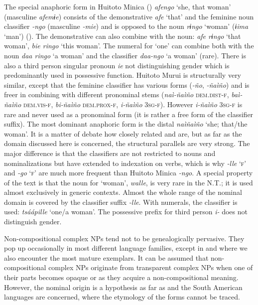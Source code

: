 \documentclass[output=collectionpaper]{langsci/langscibook}
\begin{document}
The special anaphoric form in Huitoto Minica () \textit{afengo} ‘she, that woman’ (masculine \textit{afemɨe}) consists of the demonstrative \textit{afe} ‘that’ and the feminine noun classifier \textit{-ngo} (masculine \textit{-mie}) and is opposed to the noun \textit{rɨngo} ‘woman’ (\textit{ɨima} ‘man’) (\citealt{Minor1982}). The demonstrative can also combine with the noun: \textit{afe rɨngo} ‘that woman’, \textit{bie ringo} ‘this woman’. The numeral for ‘one’ can combine both with the noun \textit{daa ringo} ‘a woman’ and the classifier \textit{daa-ngo} ‘a woman’ (rare). There is also a third person singular pronoun \textit{ie} not distinguishing gender which is predominantly used in possessive function. Huitoto Murui is structurally very similar, except that the feminine classifier has various forms (\textit{-ño}, \textit{-ñaìño})
and is freer in combining with different pronominal stems (\textit{naì-ñaìño} \textsc{dem.dist-f}, \textit{baì-ñaìño} \textsc{dem.vis-f}, \textit{bi-ñaìño} \textsc{dem.prox-f}, \textit{i-ñaìño} \textsc{3sg-f}). However \textit{i-ñaìño} \textsc{3sg-f} is rare and never used as a pronominal form (it is rather a free form of the classifier suffix). The most dominant anaphoric form is the distal \textit{naìñaìño} ‘she; that/the woman’. It is a matter of debate how closely related  and  are, but as far as the domain discussed here is concerned, the structural parallels are very strong. The major difference is that the  classifiers are not restricted to nouns and nominalizations but have extended to indexation on verbs, which is why  \textit{-lle} ‘\textsc{f}’ and  \textit{-go} ‘\textsc{f}’ are much more frequent than Huitoto Minica \textit{-ngo}. A special property of the  text is that the noun for ‘woman’, \textit{walle}, is very rare in the N.T.; it is used almost exclusively in generic contexts. Almost the whole range of the nominal domain is covered by the classifier suffix \textit{-lle}. With numerals, the classifier is used: \textit{tsáápille} ‘one/a woman’. The possessive prefix for third person \textit{i-} does not distinguish gender.

Non-compositional complex NPs tend not to be genealogically pervasive. They pop up occasionally in most different language families, except in  and  where we also encounter the most mature exemplars. It can be assumed that non-compositional complex NPs originate from transparent complex NPs when one of their parts becomes opaque or as they acquire a non-compositional meaning. However, the nominal origin is a hypothesis as far as  and the South American languages are concerned, where the etymology of the forms cannot be traced.
\end{document}

